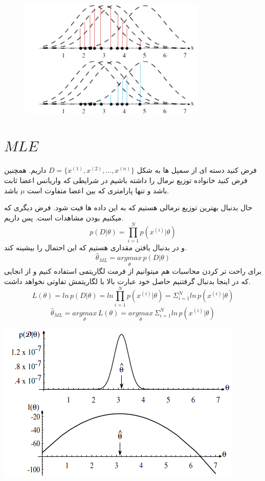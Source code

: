 \documentclass[12pt]{article}
\begin{document}
\begin{figure}[h]
    \centering
    \includegraphics[width=0.8\textwidth]{figs/normalDistMLE2.png}
    \label{fig:your_label}
\end{figure}


\section*{$MLE$}
فرض کنید دسته ای از سمپل ها به شکل
$D = \{x^{(1)}, x^{(2)}, ..., x^{(n)}\}$
داریم. همچنین فرض کنید خانواده توزیع نرمال را داشته باشیم در شرایطی که واریانس اعضا ثابت باشد و تنها پارامتری که بین اعضا متفاوت است 
$\mu$
باشد.


حال بدنبال بهترین توزیع نرمالی هستیم که به این داده ها فیت شود. فرض دیگری که میکنیم 
بودن مشاهدات است.
پس داریم.
\[p(D|\theta) = \prod_{i=1}^{N} p(x^{(i)}|\theta)\]
و در 
بدنبال یافتن مقداری هستیم که این احتمال را بیشینه کند.
\[\hat{\theta}_{ML} = \underset{\theta}{argmax} \,p(D|\theta)\]
برای راحت تر کردن محاسبات هم میتوانیم از فرمت لگاریتمی استفاده کنیم و از انجایی که در اینجا بدنبال 
گرفتنیم حاصل خود عبارت بالا با لگاریتمش تفاوتی نخواهد داشت.
\[L(\theta) = ln \,p(D|\theta) = ln \prod_{i = 1}^{N} p(x^{(i)}|\theta) = \Sigma_{i=1}^{N} ln \,p(x^{(i)}|\theta)\]
\[\hat{\theta}_{ML} = \underset{\theta}{argmax}\,L(\theta) = \underset{\theta}{argmax}\, \Sigma_{i=1}^{N} ln \,p(x^{(i)}|\theta)\]

\includegraphics[width=\textwidth]{figs/Lograithm.png}
\end{document}
